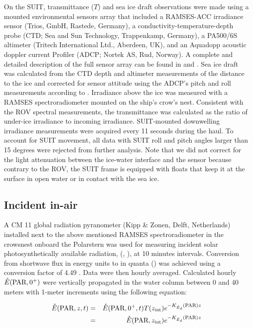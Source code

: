 On the SUIT, transmittance ($T$) and sea ice draft observations were made using a mounted environmental sensors array that included a RAMSES-ACC irradiance sensor (Trios, GmbH, Rastede, Germany), a conductivity-temperature-depth probe (CTD; Sea and Sun Technology, Trappenkamp, Germany), a PA500/6S altimeter (Tritech International Ltd., Aberdeen, UK), and an Aquadopp acoustic doppler current Profiler (ADCP; Nortek AS, Rud, Norway). A complete and detailed description of the full sensor array can be found in \citet{David2015} and \citet{Lange2016}. Sea ice draft was calculated from the CTD depth and altimeter measurements of the distance to the ice and corrected for sensor attitude using the ADCP's pitch and roll measurements according to \citet{Lange2016}. Irradiance above the ice was measured with a RAMSES spectroradiometer mounted on the ship's crow's nest. Consistent with the ROV spectral measurements, the transmittance was calculated as the ratio of under-ice irradiance to incoming irradiance. SUIT-mounted downwelling irradiance measurements were acquired every 11 seconds during the haul. To account for SUIT movement, all data with SUIT roll and pitch angles larger than 15 degrees were rejected from further analysis. Note that we did not correct for the light attenuation between the ice-water interface and the sensor because contrary to the ROV, the SUIT frame is equipped with floats that keep it at the surface in open water or in contact with the sea ice. 

\subsection{Incident in-air \eparscalar{}}

A CM 11 global radiation pyranometer (Kipp \& Zonen, Delft, Netherlands) installed next to the above mentioned RAMSES spectroradiometer in the crowsnest onboard the Polarstern was used for measuring incident solar photosynthetically available radiation, (\eparscalar{}, \wmsquare), at 10 minutes intervals. Conversion from shortwave flux in energy units to \eparscalar{} in quanta (\micromol{}) was achieved using a conversion factor of 4.49 \citep{McCree1972}. Data were then hourly averaged. Calculated hourly $\mathring{E}(\textnormal{PAR}, 0^+)$ were vertically propagated in the water column between 0 and 40 meters with 1-meter increments using the following equation:

\begin{linenomath*}
    \begin{eqnarray}
        \mathring{E}(\textnormal{PAR}, z, t) & = & \mathring{E}(\textnormal{PAR}, 0^+, t){}T(z_{\textnormal{int}})e^{-K_{\mathring{E}_d}(\textnormal{PAR}){}z} \\
        & = & \mathring{E}(\textnormal{PAR}, z_\textnormal{int})e^{-K_{\mathring{E}_d}(\textnormal{PAR}){}z} \nonumber
    \end{eqnarray}
\end{linenomath*}


